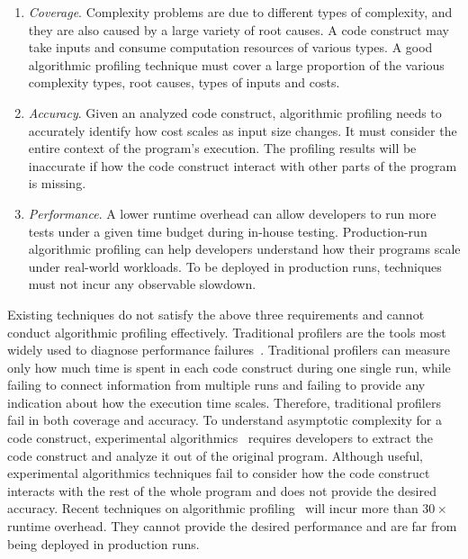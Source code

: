 \begin{enumerate}

\item \textit{Coverage}. Complexity problems are due to different types of complexity, 
and they are also caused by a large variety of root causes. 
A code construct may take inputs and 
consume computation resources of various types.
A good algorithmic profiling technique must cover a 
large proportion of the various complexity types, root causes, types of inputs and costs.


\item \textit{Accuracy}. 
Given an analyzed code construct,
algorithmic profiling needs to accurately identify 
how cost scales as input size changes.
It must consider the entire context of the program's execution.
The profiling results will be inaccurate if how the code construct interact with other parts of the program is missing. 

\item \textit{Performance}. 
A lower runtime overhead can allow developers to run more tests 
under a given time budget during in-house testing.
Production-run algorithmic profiling can help developers 
understand how their programs scale
under real-world workloads.
To be deployed in production runs, 
techniques must not incur any observable slowdown.


\end{enumerate}

Existing techniques do not satisfy the above three requirements and 
cannot conduct algorithmic profiling effectively. 
Traditional profilers are the tools most widely used to 
diagnose performance failures~\cite{gprof,oprofile}. 
Traditional profilers can measure only how much time is spent in each code construct during one single run, 
while failing to connect information from multiple runs 
and failing to provide any indication about how the execution time scales.
Therefore, traditional profilers fail in both coverage and accuracy.  
To understand asymptotic complexity for a code construct,
experimental algorithmics~\cite{expalg1,expalg2,expalg3} requires developers to 
extract the code construct and analyze it out of the original program. 
Although useful,
experimental algorithmics techniques fail to consider how the code 
construct interacts with the rest of the whole program and does not provide the desired accuracy. 
Recent techniques on algorithmic profiling~\cite{Aprof1,Aprof2,AlgoProf} will incur more than $30\times$ runtime overhead.
They cannot provide the desired performance and are far from being deployed in production runs. 


